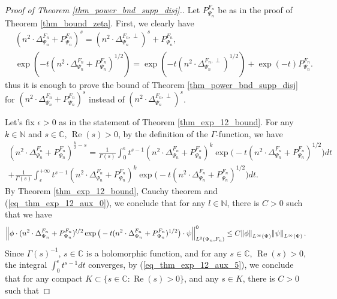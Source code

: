 \documentclass[12pt]{article}
\numberwithin{equation}{section}
\theoremstyle{theorem}
\theoremstyle{definition}
\theoremstyle{remark}
\newcommand{\comp}{\mathbb{C}}
\newcommand{\nat}{\mathbb{N}}
\newcommand{\laplcomp}{\Delta}
\renewcommand{\Re}{\operatorname{Re}}
\begin{document}
	\begin{proof}[Proof of Theorem \ref{thm_power_bnd_supp_disj}.]
		Let $P_{\Psi_n}^{F_n}$ be as in the proof of Theorem \ref{thm_bound_zeta}.
		First, we clearly have
		\begin{equation}\label{eq_thm_exp_12_aux_0}
		\begin{aligned}
			&
			(n^2 \cdot\laplcomp_{\Psi_n}^{F_n} + P_{\Psi_n}^{F_n})^{s} = (n^2 \cdot\laplcomp_{\Psi_n}^{F_n, \perp})^{s}  + P_{\Psi_n}^{F_n},
			\\
			&
			\exp(-t(n^2 \cdot\laplcomp_{\Psi_n}^{F_n} + P_{\Psi_n}^{F_n})^{1/2}) = \exp(-t(n^2 \cdot\laplcomp_{\Psi_n}^{F_n, \perp})^{1/2})  + \exp(-t) P_{\Psi_n}^{F_n}.
		\end{aligned}
		\end{equation}
		thus it is enough to prove the bound of Theorem \ref{thm_power_bnd_supp_disj} for $(n^2 \cdot\laplcomp_{\Psi_n}^{F_n} + P_{\Psi_n}^{F_n})^{s}$ instead of $(n^2 \cdot\laplcomp_{\Psi_n}^{F_n, \perp})^{s}$.
		\par 
		Let's fix $\epsilon > 0$ as in the statement of Theorem \ref{thm_exp_12_bound}.
		For any $k \in \nat$ and $s \in \comp$, $\Re(s) > 0$, by the definition of the $\Gamma$-function, we have
		\begin{multline}\label{eq_thm_exp_12_aux_1}
		(n^2 \cdot\laplcomp_{\Psi_n}^{F_n} + P_{\Psi_n}^{F_n})^{\frac{k}{2} - s} 
			= 
			\frac{1}{\Gamma(s)}
			\int_0^{\epsilon} t^{s-1} (n^2 \cdot\laplcomp_{\Psi_n}^{F_n} + P_{\Psi_n}^{F_n})^{k} \exp \big(-t (n^2 \cdot\laplcomp_{\Psi_n}^{F_n} + P_{\Psi_n}^{F_n})^{1/2} \big) dt
			\\
			+
			\frac{1}{\Gamma(s)}
			\int_{\epsilon}^{+\infty} t^{s-1} (n^2 \cdot\laplcomp_{\Psi_n}^{F_n} + P_{\Psi_n}^{F_n})^{k} \exp \big(-t (n^2 \cdot\laplcomp_{\Psi_n}^{F_n} + P_{\Psi_n}^{F_n})^{1/2} \big) dt
			.
		\end{multline}
		By Theorem \ref{thm_exp_12_bound}, Cauchy theorem and (\ref{eq_thm_exp_12_aux_0}), we conclude  that for any $l \in \nat$, there is $C > 0$ such that we have
		\begin{equation}\label{eq_thm_exp_12_aux_5}
			\Big\| \phi \cdot (n^2 \cdot\laplcomp_{\Psi_n}^{F_n} + P_{\Psi_n}^{F_n})^{l/2} \exp \big(-t (n^2 \cdot\laplcomp_{\Psi_n}^{F_n} + P_{\Psi_n}^{F_n})^{1/2} \big) \cdot \psi \Big\|_{L^2(\Psi_n, F_n)}^{0} \leq C \norm{\phi}_{L^{\infty}(\Psi)} \norm{\psi}_{L^{\infty}(\Psi)}.
		\end{equation}
		Since $\Gamma(s)^{-1}$, $s \in \comp$ is a holomorphic function, and for any $s \in \comp$, $\Re(s) > 0$, the integral $\int_0^{\epsilon} t^{s - 1} dt$ converges, by (\ref{eq_thm_exp_12_aux_5}), we conclude that for any compact $K \subset \{s \in \comp : \Re(s) > 0 \}$, and any $s \in K$, there is $C > 0$ such that

\end{proof}
\end{document}
